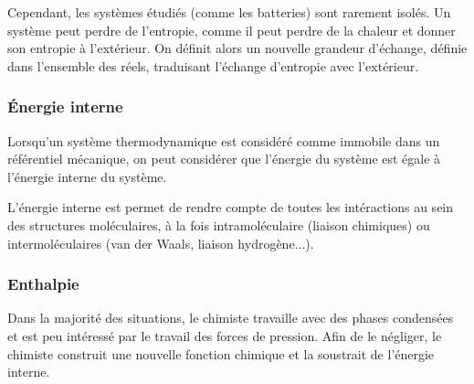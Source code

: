 Cependant, les systèmes étudiés (comme les batteries) sont rarement isolés. Un système peut perdre de l'entropie, comme il peut perdre de la chaleur et donner son entropie à l'extérieur. On définit alors un nouvelle grandeur d'échange, définie dans l'ensemble des réels, traduisant l'échange d'entropie avec l'extérieur. 




\subsubsection{\'{E}nergie interne}

Lorsqu'un système thermodynamique est considéré comme immobile dans un référentiel mécanique, on peut considérer que l'énergie du système est égale à l'énergie interne du système.


L'énergie interne est permet de rendre compte de toutes les intéractions au sein des structures moléculaires, à la fois intramoléculaire (liaison chimiques) ou intermoléculaires (van der Waals, liaison hydrogène$\ldots$).

\subsubsection{Enthalpie}
Dans la majorité des situations, le chimiste travaille avec des phases condensées et est peu intéressé par le travail des forces de pression. Afin de le négliger, le chimiste construit une nouvelle fonction chimique et la soustrait de l'énergie interne.


